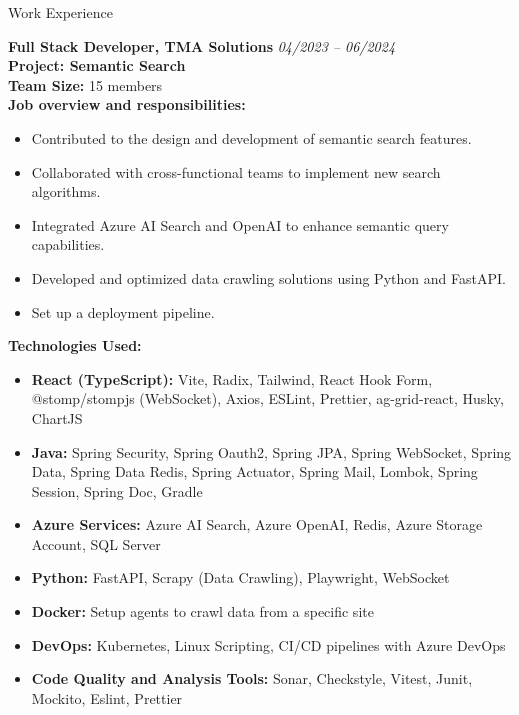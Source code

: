 \documentclass{resume} %
\begin{document}
\begin{rSection}{Work Experience}
\vspace{0.2cm} %

{\bf Full Stack Developer, TMA Solutions} \hfill {\em 04/2023 – 06/2024}
\\ \textbf{Project: Semantic Search}
\\ \textbf{Team Size:} 15 members
\\ \textbf{Job overview and responsibilities:}
\begin{itemize}
    \item Contributed to the design and development of semantic search features.
    \item Collaborated with cross-functional teams to implement new search algorithms.
    \item Integrated Azure AI Search and OpenAI to enhance semantic query capabilities.
    \item Developed and optimized data crawling solutions using Python and FastAPI.
    \item Set up a deployment pipeline.
\end{itemize}
\textbf{Technologies Used:}
\begin{itemize}
    \item \textbf{React (TypeScript):} Vite, Radix, Tailwind, React Hook Form, @stomp/stompjs (WebSocket), Axios, ESLint, Prettier, ag-grid-react, Husky, ChartJS
    \item \textbf{Java:} Spring Security, Spring Oauth2, Spring JPA, Spring WebSocket, Spring Data, Spring Data Redis, Spring Actuator, Spring Mail, Lombok, Spring Session, Spring Doc, Gradle
    \item \textbf{Azure Services:} Azure AI Search, Azure OpenAI, Redis, Azure Storage Account, SQL Server
    \item \textbf{Python:} FastAPI, Scrapy (Data Crawling), Playwright, WebSocket
    \item \textbf{Docker:} Setup agents to crawl data from a specific site
    \item \textbf{DevOps:} Kubernetes, Linux Scripting, CI/CD pipelines with Azure DevOps
    \item \textbf{Code Quality and Analysis Tools:} Sonar, Checkstyle, Vitest, Junit, Mockito, Eslint, Prettier
\end{itemize}

\vspace{0.2cm} %


\end{rSection}
\end{document}

